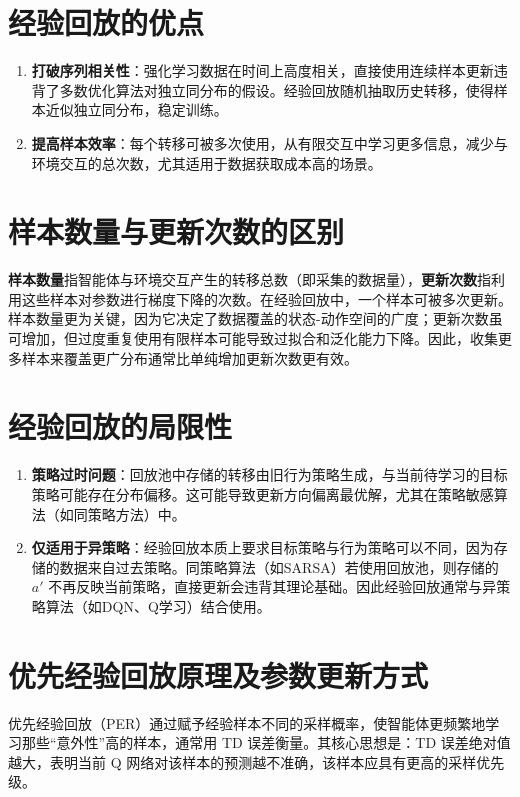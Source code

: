 \documentclass{article}
\begin{document}
\section{经验回放的优点}
\begin{enumerate}
    \item \textbf{打破序列相关性}：强化学习数据在时间上高度相关，直接使用连续样本更新违背了多数优化算法对独立同分布的假设。经验回放随机抽取历史转移，使得样本近似独立同分布，稳定训练。
    \item \textbf{提高样本效率}：每个转移可被多次使用，从有限交互中学习更多信息，减少与环境交互的总次数，尤其适用于数据获取成本高的场景。
\end{enumerate}

\section{样本数量与更新次数的区别}
\textbf{样本数量}指智能体与环境交互产生的转移总数（即采集的数据量），\textbf{更新次数}指利用这些样本对参数进行梯度下降的次数。在经验回放中，一个样本可被多次更新。样本数量更为关键，因为它决定了数据覆盖的状态-动作空间的广度；更新次数虽可增加，但过度重复使用有限样本可能导致过拟合和泛化能力下降。因此，收集更多样本来覆盖更广分布通常比单纯增加更新次数更有效。

\section{经验回放的局限性}
\begin{enumerate}
    \item \textbf{策略过时问题}：回放池中存储的转移由旧行为策略生成，与当前待学习的目标策略可能存在分布偏移。这可能导致更新方向偏离最优解，尤其在策略敏感算法（如同策略方法）中。
    \item \textbf{仅适用于异策略}：经验回放本质上要求目标策略与行为策略可以不同，因为存储的数据来自过去策略。同策略算法（如SARSA）若使用回放池，则存储的 \(a'\) 不再反映当前策略，直接更新会违背其理论基础。因此经验回放通常与异策略算法（如DQN、Q学习）结合使用。
\end{enumerate}

\section{优先经验回放原理及参数更新方式}
优先经验回放（PER）通过赋予经验样本不同的采样概率，使智能体更频繁地学习那些“意外性”高的样本，通常用 TD 误差衡量。其核心思想是：TD 误差绝对值越大，表明当前 Q 网络对该样本的预测越不准确，该样本应具有更高的采样优先级。
\end{document}
